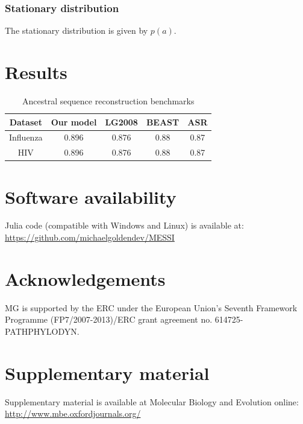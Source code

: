 \documentclass[nogrid]{MBE}%
\begin{document}
\subsubsection{Stationary distribution}
The stationary distribution is given by $p(a)$.

\section{Results}


\begin{table}
	\captionsetup{justification=centering}
	\caption{\label{tab:sequencereconstruction} Ancestral sequence reconstruction benchmarks}	
	\begin{tabularx}{1.0\linewidth}{ccccc}
	\toprule
	Dataset & Our model & LG2008 & BEAST & ASR\\
	\midrule
	\rowcolor{black!20} Influenza & 0.896 & 0.876 & 0.88 & 0.87\tabularnewline
	HIV & 0.896 & 0.876 & 0.88 & 0.87\tabularnewline
	\bottomrule
	\end{tabularx}
\end{table}

\section{Software availability}
Julia code (compatible with Windows and Linux) is available at: \href{https://github.com/michaelgoldendev/MESSI}{https://github.com/michaelgoldendev/MESSI}

\section{Acknowledgements}
MG is supported by the ERC under the European Union’s Seventh Framework Programme (FP7/2007-2013)/ERC grant agreement no. 614725-PATHPHYLODYN. 

\ifmbeformat
\section{Supplementary material}
Supplementary material is available  at Molecular Biology and Evolution
online: \url{http://www.mbe.oxfordjournals.org/}
\fi

\end{document}
